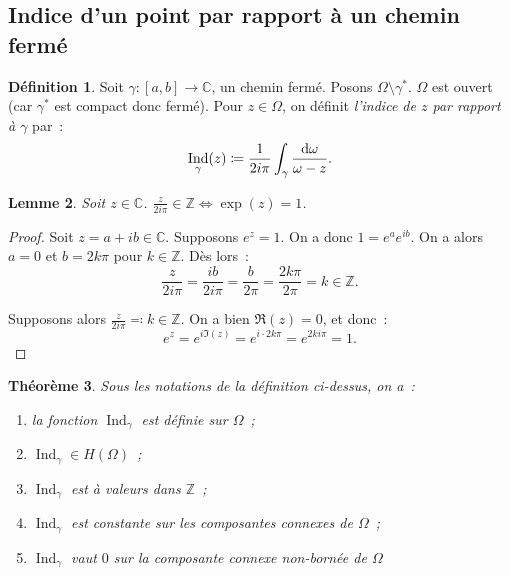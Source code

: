 \documentclass{report}
\newtheorem{thm}{Théorème}[chapter]
\newtheorem{lem}[thm]{Lemme}
\theoremstyle{definition}
\newtheorem{déf}[thm]{Définition}
\theoremstyle{remark}
\numberwithin{equation}{section}
\newcommand{\C}{\mathbb C}
\newcommand{\Z}{\mathbb Z}
\DeclareMathOperator{\Ind}{Ind}
\begin{document}
		\subsection{Indice d'un point par rapport à un chemin fermé}
			\begin{déf} Soit $\gamma : [a, b] \to \C$, un chemin fermé. Posons $\Omega \setminus \gamma^*$. $\Omega$ est ouvert (car $\gamma^*$ est compact donc fermé).
			Pour $z \in \Omega$, on définit \textit{l'indice de $z$ par rapport à $\gamma$} par~:
			\begin{equation}
				\Ind_\gamma(z) \coloneqq \frac 1{2i\pi}\int_\gamma \frac {\dif \omega}{\omega - z}.
			\end{equation}
			\end{déf}

			\begin{lem}\label{lem:e^z=1} Soit $z \in \C$. $\frac z{2i\pi} \in \Z \iff \exp(z) = 1$.
			\end{lem}

			\begin{proof} Soit $z = a + ib\in \C$. Supposons $e^z = 1$. On a donc $1 = e^ae^{ib}$. On a alors $a=0$ et $b=2k\pi$ pour $k \in \Z$. Dès lors~:
			\begin{equation}
				\frac z{2i\pi} = \frac {ib}{2i\pi} = \frac b{2\pi} = \frac {2k\pi}{2\pi} = k \in \Z.
			\end{equation}

			Supposons alors $\frac z{2i\pi} \eqqcolon k \in \Z$. On a bien $\Re(z) = 0$, et donc~:
			\begin{equation}
				e^z = e^{i\Im(z)} = e^{i \cdot 2k\pi} = e^{2ki\pi} = 1.
			\end{equation}
			\end{proof}

			\begin{thm} Sous les notations de la définition ci-dessus, on a~:
			\begin{enumerate}
				\item la fonction $\Ind_\gamma$ est définie sur $\Omega$~;  %
				\item $\Ind_\gamma \in H(\Omega)$~;
				\item $\Ind_\gamma$ est à valeurs dans $\Z$~;
				\item $\Ind_\gamma$ est constante sur les composantes connexes de $\Omega$~;
				\item $\Ind_\gamma$ vaut $0$ sur la composante connexe non-bornée de $\Omega$
			\end{enumerate}
			\end{thm}
\end{document}
